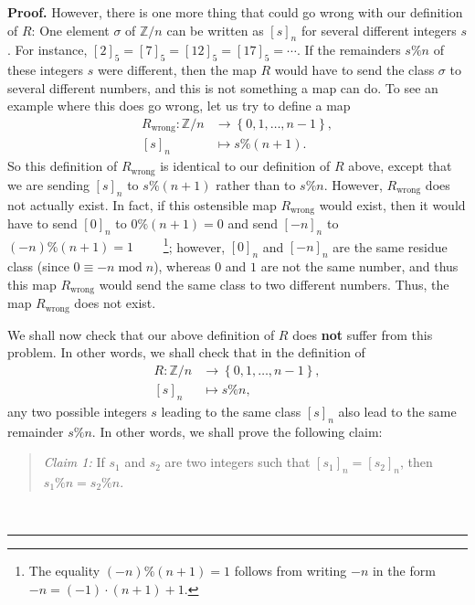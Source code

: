 \documentclass[numbers=enddot,12pt,final,onecolumn,notitlepage]{scrartcl}%
\numberwithin{exer}{subsection}
\theoremstyle{definition}
\newenvironment{statement}{\begin{quote}}{\end{quote}}
\newenvironment{proof}[1][Proof]{\noindent\textbf{#1.} }{\ \rule{0.5em}{0.5em}}
\begin{document}
\begin{proof}
However, there is one more thing that could go wrong with our definition of
$R$: One element $\sigma$ of $\mathbb{Z}/n$ can be written as $\left[
s\right]  _{n}$ for several different integers $s$. For instance, $\left[
2\right]  _{5}=\left[  7\right]  _{5}=\left[  12\right]  _{5}=\left[
17\right]  _{5}=\cdots$. If the remainders $s\%n$ of these integers $s$ were
different, then the map $R$ would have to send the class $\sigma$ to several
different numbers, and this is not something a map can do. To see an example
where this does go wrong, let us try to define a map%
\begin{align*}
R_{\operatorname*{wrong}}:\mathbb{Z}/n  &  \rightarrow\left\{  0,1,\ldots
,n-1\right\}  ,\\
\left[  s\right]  _{n}  &  \mapsto s\%\left(  n+1\right)  .
\end{align*}
So this definition of $R_{\operatorname*{wrong}}$ is identical to our
definition of $R$ above, except that we are sending $\left[  s\right]  _{n}$
to $s\%\left(  n+1\right)  $ rather than to $s\%n$. However,
$R_{\operatorname*{wrong}}$ does not actually exist. In fact, if this
ostensible map $R_{\operatorname*{wrong}}$ would exist, then it would have to
send $\left[  0\right]  _{n}$ to $0\%\left(  n+1\right)  =0$ and send $\left[
-n\right]  _{n}$ to $\left(  -n\right)  \%\left(  n+1\right)  =1$%
\ \ \ \ \footnote{The equality $\left(  -n\right)  \%\left(  n+1\right)  =1$
follows from writing $-n$ in the form $-n=\left(  -1\right)  \cdot\left(
n+1\right)  +1$.}; however, $\left[  0\right]  _{n}$ and $\left[  -n\right]
_{n}$ are the same residue class (since $0\equiv-n\operatorname{mod}n$),
whereas $0$ and $1$ are not the same number, and thus this map
$R_{\operatorname*{wrong}}$ would send the same class to two different
numbers. Thus, the map $R_{\operatorname*{wrong}}$ does not exist.

We shall now check that our above definition of $R$ does \textbf{not} suffer
from this problem. In other words, we shall check that in the definition of
\begin{align*}
R:\mathbb{Z}/n  &  \rightarrow\left\{  0,1,\ldots,n-1\right\}  ,\\
\left[  s\right]  _{n}  &  \mapsto s\%n,
\end{align*}
any two possible integers $s$ leading to the same class $\left[  s\right]
_{n}$ also lead to the same remainder $s\%n$. In other words, we shall prove
the following claim:

\begin{statement}
\textit{Claim 1:} If $s_{1}$ and $s_{2}$ are two integers such that $\left[
s_{1}\right]  _{n}=\left[  s_{2}\right]  _{n}$, then $s_{1}\%n=s_{2}\%n$.
\end{statement}


\end{proof}
\end{document}
